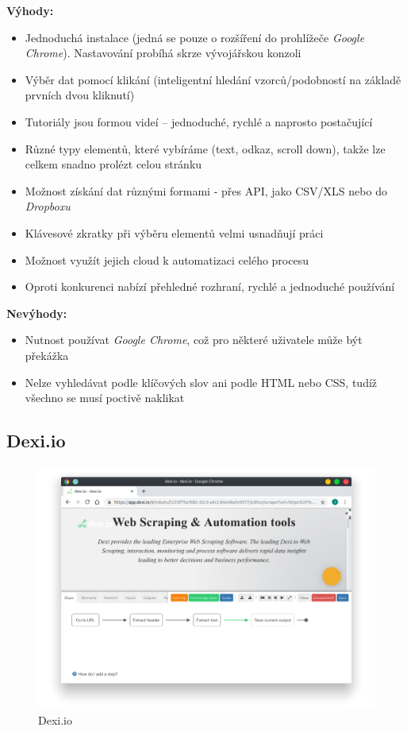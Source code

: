 \documentclass[thesis=B,czech]{FITthesis}[2012/06/26]
\begin{document}
\textbf{Výhody:}
\begin{itemize}
	\item Jednoduchá instalace (jedná se pouze o rozšíření do prohlížeče \emph{Google Chrome}). Nastavování probíhá skrze vývojářskou konzoli
	\item Výběr dat pomocí klikání (inteligentní hledání vzorců/podobností na základě prvních dvou kliknutí)
	\item Tutoriály jsou formou videí -- jednoduché, rychlé a naprosto postačující
	\item Různé typy elementů, které vybíráme (text, odkaz, scroll down), takže lze celkem snadno prolézt celou stránku
	\item Možnost získání dat různými formami - přes API, jako CSV/XLS nebo do \emph{Dropboxu}
	\item Klávesové zkratky při výběru elementů velmi usnad\v{n}ují práci
	\item Možnost využít jejich cloud k automatizaci celého procesu
	\item Oproti konkurenci nabízí přehledné rozhraní, rychlé a jednoduché používání
\end{itemize}

\textbf{Nevýhody:}
\begin{itemize}
	\item Nutnost používat \emph{Google Chrome}, což pro některé uživatele může být překážka
	\item Nelze vyhledávat podle klíčových slov ani podle HTML nebo CSS, tudíž všechno se musí poctivě naklikat
\end{itemize}


\newpage
\subsection{Dexi.io}
\begin{figure}[h!]
	\includegraphics[width=\linewidth]{images/Dexiio.png}
	\caption{Dexi.io}
	\label{fig:dexi.io}
\end{figure}
\end{document}
